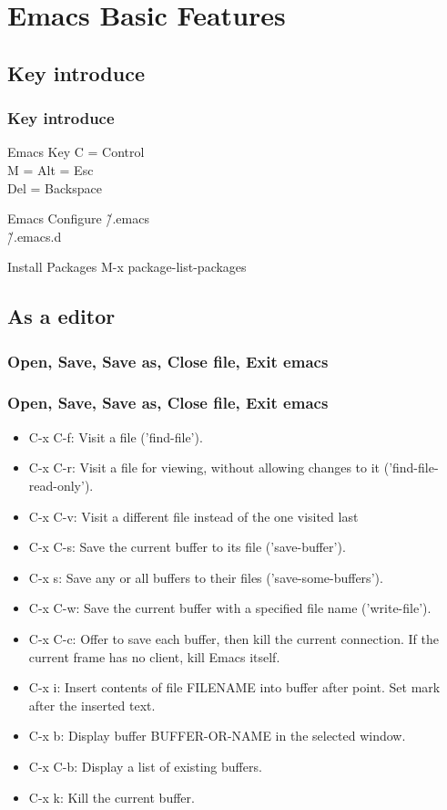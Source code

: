 \section{Emacs Basic Features}
\subsection{Key introduce}
\begin{frame}
	\frametitle{Key introduce}
	\begin{block}{Emacs Key}
    C = Control\\
    M = Alt = Esc\\
    Del = Backspace
	\end{block}
	\pause
	\begin{exampleblock}{Emacs Configure}
    \~/.emacs\\
    \~/.emacs.d
	\end{exampleblock}
	\pause
	\begin{alertblock}{Install Packages}
    M-x package-list-packages
	\end{alertblock}
\end{frame}
\subsection{As a editor}
\subsubsection{Open, Save, Save as, Close file, Exit emacs}
\begin{frame}[allowframebreaks]
\frametitle{Open, Save, Save as, Close file, Exit emacs}
    \begin{itemize}
        \item C-x C-f: Visit a file ('find-file').
        \item C-x C-r: Visit a file for viewing, without allowing changes to it ('find-file-read-only').
        \item C-x C-v: Visit a different file instead of the one visited last
        \item C-x C-s: Save the current buffer to its file ('save-buffer').
        \item C-x s: Save any or all buffers to their files ('save-some-buffers').
        \item C-x C-w: Save the current buffer with a specified file name ('write-file').
        \item C-x C-c: Offer to save each buffer, then kill the current connection. If the current frame has no client, kill Emacs itself.
        \item C-x i: Insert contents of file FILENAME into buffer after point. Set mark after the inserted text.
        \item C-x b: Display buffer BUFFER-OR-NAME in the selected window.
        \item C-x C-b: Display a list of existing buffers.
        \item C-x k: Kill the current buffer.
    \end{itemize}
\end{frame}
